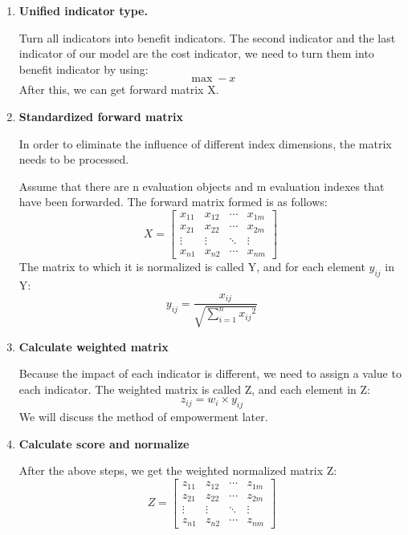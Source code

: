 \documentclass[12pt]{article}  %
\begin{document}
\begin{enumerate}[\bfseries 1.]
	\item \textbf{Unified indicator type.}
	
	Turn all indicators into benefit indicators. The second indicator and the last indicator of our model are the cost indicator, we need to turn them into benefit indicator by using:
	\begin{equation}
		\max  - x
	\end{equation}
	After this, we can get forward matrix X.
	
	\item \textbf{Standardized forward matrix}
	
	In order to eliminate the influence of different index dimensions, the matrix needs to be processed.
	
	Assume that there are n evaluation objects and m evaluation indexes that have been forwarded. The forward matrix formed is as follows:
	\begin{equation}
	X = \left[ {\begin{array}{*{20}{c}}
		{{x_{11}}}&{{x_{12}}}& \cdots &{{x_{1m}}}\\
		{{x_{21}}}&{{x_{22}}}& \cdots &{{x_{2m}}}\\
		\vdots & \vdots & \ddots & \vdots \\
		{{x_{n1}}}&{{x_{n2}}}& \cdots &{{x_{nm}}}
		\end{array}} \right]\
	\end{equation}
	The matrix to which it is normalized is called Y, and for each element ${y_{ij}}$ in Y:
	\begin{equation}
	{y_{ij}} = \frac{{{x_{ij}}}}{{\sqrt {\sum\limits_{i = 1}^n {{x_{ij}}^2} } }}
	\end{equation}
	
	\item \textbf{Calculate weighted matrix}
	
	Because the impact of each indicator is different, we need to assign a value to each indicator. The weighted matrix is called Z, and each element in Z:
	\begin{equation}
	{z_{ij}} = {w_i} \times {y_{ij}}
	\end{equation}
	We will discuss the method of empowerment later.
	
	\item \textbf{Calculate score and normalize}
	
	After the above steps, we get the weighted normalized matrix Z:
	\begin{equation}
	Z = \left[ {\begin{array}{*{20}{c}}
		{{z_{11}}}&{{z_{12}}}& \cdots &{{z_{1m}}}\\
		{{z_{21}}}&{{z_{22}}}& \cdots &{{z_{2m}}}\\
		\vdots & \vdots & \ddots & \vdots \\
		{{z_{n1}}}&{{z_{n2}}}& \cdots &{{z_{nm}}}
		\end{array}} \right]
	\end{equation}
	

\end{enumerate}
\end{document}
